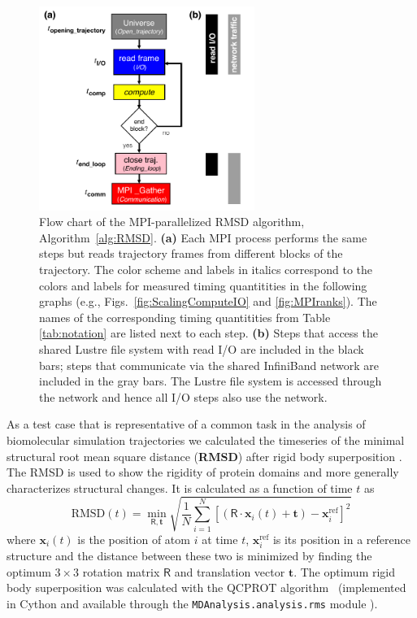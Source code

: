 \begin{figure}[!htb]
  \centering
  \includegraphics[width=7cm]{figures/flowchart.pdf}
  \caption{Flow chart of the MPI-parallelized RMSD algorithm, Algorithm~\ref{alg:RMSD}.
    \textbf{(a)} Each MPI process performs the same steps but reads trajectory frames from different blocks of the trajectory.
    The color scheme and labels in italics correspond to the colors and labels for measured timing quantitities in the following graphs (e.g., Figs.~\protect\ref{fig:ScalingComputeIO} and \protect\ref{fig:MPIranks}).
    The names of the corresponding timing quantitities from Table \protect\ref{tab:notation} are listed next to each step.
    \textbf{(b)} Steps that access the shared Lustre file system with read I/O are included in the black bars; steps that communicate via the shared InfiniBand network are included in the gray bars.
    The Lustre file system is accessed through the network and hence all I/O steps also use the network.
  }
  \label{fig:flowchart}
\end{figure}

As a test case that is representative of a common task in the analysis of biomolecular simulation trajectories we calculated the timeseries of the minimal structural root mean square distance  (\textbf{RMSD}) after rigid body superposition \cite{Lea96, Mura:2014kx}.
The RMSD is used to show the rigidity of protein domains and more generally characterizes structural changes.
It is calculated as a function of time $t$ as
\begin{equation}
  \label{eq:rmsd}
  \text{RMSD}(t) = \min_{\mathsf{R}, \mathbf{t}} %
  \sqrt{\frac{1}{N} \sum_{i=1}^{N} \left[ %
      (\mathsf{R}\cdot\mathbf{x}_{i}(t) + \mathbf{t}) - \mathbf{x}_{i}^{\text{ref}} \right]^{2}}
\end{equation}
where $\mathbf{x}_{i}(t)$ is the position of atom $i$ at time $t$, $\mathbf{x}_{i}^{\text{ref}}$ is its position in a reference structure and the distance between these two is minimized by finding the optimum $3\times3$ rotation matrix $\mathsf{R}$ and translation vector $\mathbf{t}$. 
The optimum rigid body superposition was calculated with the QCPROT algorithm~\cite{Liu:2010kx,Theobald:2005vn} (implemented in Cython and available through the \texttt{MDAnalysis.analysis.rms} module \cite{Gowers:2016aa}).

